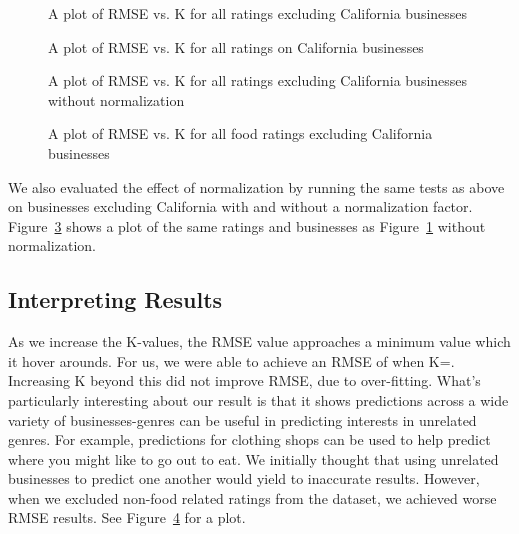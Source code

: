 \begin{figure}[ht!]
	\centering
	\caption[]{A plot of RMSE vs. K for all ratings excluding California businesses}
	\label{fig:nocal}
\end{figure}


\begin{figure}[ht!]
	\centering
	\caption[]{A plot of RMSE vs. K for all ratings on California businesses}
	\label{fig:cal}
\end{figure}

\begin{figure}[ht!]
	\centering
	\caption[]{A plot of RMSE vs. K for all ratings excluding California businesses without normalization}
	\label{fig:norm}
\end{figure}

\begin{figure}[ht!]
	\centering
	\caption[]{A plot of RMSE vs. K for all food ratings excluding California businesses}
	\label{fig:foodonly}
\end{figure}

We also evaluated the effect of normalization by running the same tests as above on businesses excluding California with and without a normalization factor. Figure~\ref{fig:norm} shows a plot of the same ratings and businesses as Figure~\ref{fig:nocal} without normalization.

\subsection{Interpreting Results}
As we increase the K-values, the RMSE value approaches a minimum value which it hover arounds. For us, we were able to achieve an RMSE of \bestRMSE when K=\bestK. Increasing K beyond this did not improve RMSE, due to over-fitting. What's particularly interesting about our result is that it shows predictions across a wide variety of businesses-genres can be useful in predicting interests in unrelated genres. For example, predictions for clothing shops can be used to help predict where you might like to go out to eat. We initially thought that using unrelated businesses to predict one another would yield to inaccurate results. However, when we excluded non-food related ratings from the dataset, we achieved worse RMSE results. See Figure~\ref{fig:foodonly} for a plot.

